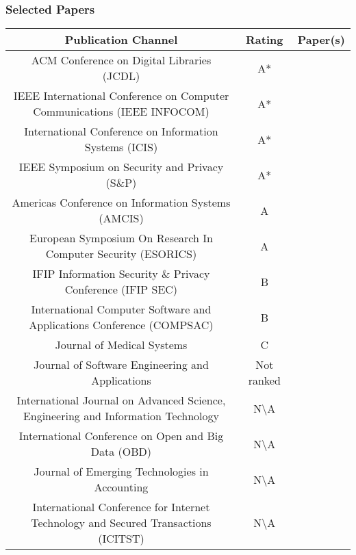 
\begin{landscape}
\subsubsection{Selected Papers}
\label{subsubsec:selected_papers}
\begin{center}
\begin{tabular}{ |c|c|c| }
	\hline
 	Publication Channel & Rating &  Paper(s) \\ [0.5ex] 
 	\hline\hline
	 ACM Conference on Digital Libraries (JCDL) & A* & \citet{2017_Gipp} \\ 
	 \hline
	 IEEE International Conference on Computer Communications (IEEE INFOCOM) & A* & \citet{2016_Kianmajd} \\ 
	 \hline
	  International Conference on Information Systems (ICIS) & A* & \citet{2017_Naerland} \\ 
	 \hline
	  IEEE Symposium on Security and Privacy (S\&P) & A* & \citet{2015_Zyskind} \\ 
	 \hline
 		Americas Conference on Information Systems (AMCIS) & A & \citet{2017_Madhwal} \\ 
	 \hline
	 European Symposium On Research In Computer Security (ESORICS) & A & \citet{2017_Tackmann} \\ 
	 \hline
	 IFIP Information Security \& Privacy Conference (IFIP SEC) & B & \citet{2016_Schaub} \\
	 \hline
	 International Computer Software and Applications Conference (COMPSAC) & B & \citet{2016_Yasin} \\ 
	 \hline
	 Journal of Medical Systems & C & \citet{2016_Yue} \\ 
	 \hline
	 Journal of Software Engineering and Applications & Not ranked & \citet{2016_Bahga} \\ 
	 \hline
	 International Journal on Advanced Science, Engineering and Information Technology & N\textbackslash A & \citet{2018_Alessandra} \\ 
	 \hline
	 International Conference on Open and Big Data (OBD) & N\textbackslash A & \citet{2016_Azaria} \\ 
	 \hline
	 Journal of Emerging Technologies in Accounting & N\textbackslash A & \citet{2017_Coyne} \\ 
	 \hline
	 International Conference for Internet Technology and Secured Transactions (ICITST) & N\textbackslash A & \citet{2015_Dennis} \\ 

\end{tabular}
\end{center}
\end{landscape}
